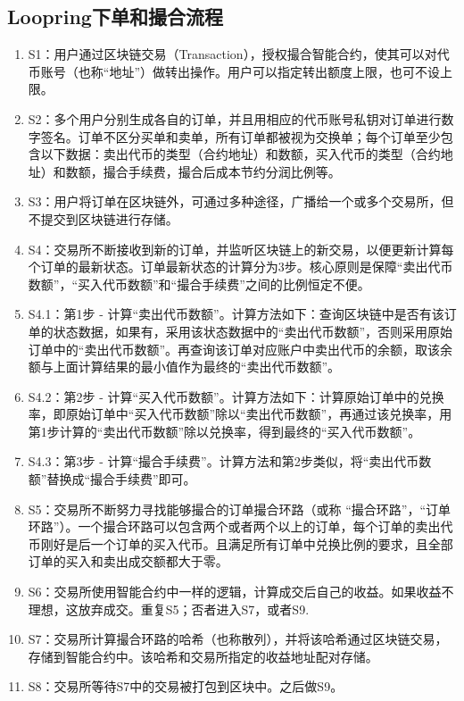 \documentclass[UTF8,nofonts]{ctexart}
\begin{document}
\begin{appendices}
\section{Loopring下单和撮合流程\label{sec:flow}}

\begin{enumerate}
	\item S1：用户通过区块链交易（Transaction），授权撮合智能合约，使其可以对代币账号（也称“地址”）做转出操作。用户可以指定转出额度上限，也可不设上限。
	\item S2：多个用户分别生成各自的订单，并且用相应的代币账号私钥对订单进行数字签名。订单不区分买单和卖单，所有订单都被视为交换单；每个订单至少包含以下数据：卖出代币的类型（合约地址）和数额，买入代币的类型（合约地址）和数额，撮合手续费，撮合后成本节约分润比例等。
	\item S3：用户将订单在区块链外，可通过多种途径，广播给一个或多个交易所，但不提交到区块链进行存储。
	\item S4：交易所不断接收到新的订单，并监听区块链上的新交易，以便更新计算每个订单的最新状态。订单最新状态的计算分为3步。核心原则是保障“卖出代币数额”，“买入代币数额”和“撮合手续费”之间的比例恒定不便。
	\item S4.1：第1步 - 计算“卖出代币数额”。计算方法如下：查询区块链中是否有该订单的状态数据，如果有，采用该状态数据中的“卖出代币数额”，否则采用原始订单中的“卖出代币数额”。再查询该订单对应账户中卖出代币的余额，取该余额与上面计算结果的最小值作为最终的“卖出代币数额”。
	\item S4.2：第2步 - 计算“买入代币数额”。计算方法如下：计算原始订单中的兑换率，即原始订单中“买入代币数额”除以“卖出代币数额”，再通过该兑换率，用第1步计算的“卖出代币数额”除以兑换率，得到最终的“买入代币数额”。
	\item S4.3：第3步 - 计算“撮合手续费”。计算方法和第2步类似，将“卖出代币数额”替换成“撮合手续费”即可。
	\item S5：交易所不断努力寻找能够撮合的订单撮合环路（或称 “撮合环路”，“订单环路”）。一个撮合环路可以包含两个或者两个以上的订单，每个订单的卖出代币刚好是后一个订单的买入代币。且满足所有订单中兑换比例的要求，且全部订单的买入和卖出成交额都大于零。
	\item S6：交易所使用智能合约中一样的逻辑，计算成交后自己的收益。如果收益不理想，这放弃成交。重复S5；否者进入S7，或者S9.
	\item S7：交易所计算撮合环路的哈希（也称散列），并将该哈希通过区块链交易，存储到智能合约中。该哈希和交易所指定的收益地址配对存储。
	\item S8：交易所等待S7中的交易被打包到区块中。之后做S9。

\end{enumerate}
\end{appendices}
\end{document}
